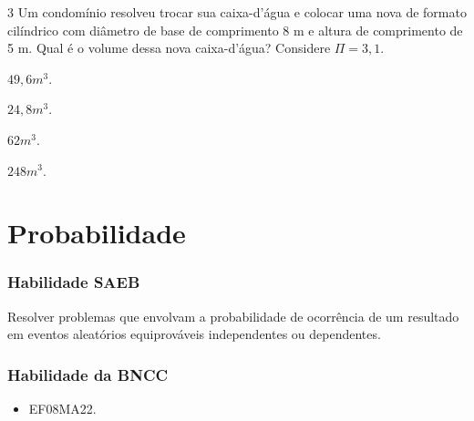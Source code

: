 {{{{\num{3} Um condomínio resolveu trocar sua caixa-d'água e colocar uma nova de
formato cilíndrico com diâmetro de base de comprimento 8 m e altura de
comprimento de 5 m. Qual é o volume dessa nova caixa-d'água? Considere $\Pi = 3,1$.

\begin{escolha}[itemsep=0pt]
\item $49,6 m^3$.
\item $24,8 m^3$.
\item $62 m^3$.
\item $248 m^3$.
\end{escolha}










\chapter{Probabilidade}

\subsection{Habilidade SAEB  }

Resolver problemas que envolvam a probabilidade de
ocorrência de um resultado em eventos aleatórios equiprováveis
independentes ou dependentes.

\subsection{Habilidade da BNCC}

\begin{itemize}
  \item EF08MA22.
\end{itemize}

}}}}
